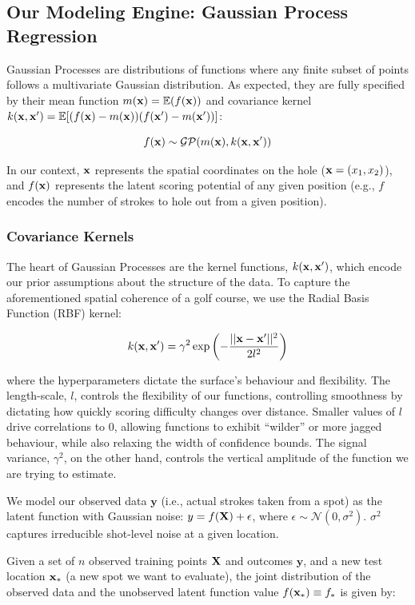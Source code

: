 \documentclass[11pt, letterpaper]{article}
\begin{document}
\subsection{Our Modeling Engine: Gaussian Process Regression}

Gaussian Processes are distributions of functions where any finite subset of points follows a multivariate Gaussian distribution. As expected, they are fully specified by their mean function $m(\mathbf{x}) = \mathbb{E}(f(\mathbf{x}))$  and covariance kernel $k(\mathbf{x},\mathbf{x}') = \mathbb{E}[(f(\mathbf{x})-m(\mathbf{x}))(f(\mathbf{x}')-m(\mathbf{x}'))]$:

\begin{equation}
    f(\mathbf{x}) \sim \mathcal{GP}(m(\mathbf{x}), k(\mathbf{x},\mathbf{x}'))
\end{equation}

In our context, $\mathbf{x}$ represents the spatial coordinates on the hole ($\mathbf{x} = (x_1, x_2)$), and $f(\mathbf{x})$ represents the latent scoring potential of any given position (e.g., $f$ encodes the number of strokes to hole out from a given position).

\subsubsection{Covariance Kernels}
The heart of Gaussian Processes are the kernel functions, $k(\mathbf{x},\mathbf{x}')$, which encode our prior assumptions about the structure of the data. To capture the aforementioned spatial coherence of a golf course, we use the Radial Basis Function (RBF) kernel:

$$k(\mathbf{x},\mathbf{x}') = \gamma^2\exp\left(-\frac{||\mathbf{x}-\mathbf{x}'||^2}{2l^2}\right)$$

where the hyperparameters dictate the surface's behaviour and flexibility. The length-scale, $l$, controls the flexibility of our functions, controlling smoothness by dictating how quickly scoring difficulty changes over distance. Smaller values of $l$ drive correlations to $0$, allowing functions to exhibit ``wilder'' or more jagged behaviour, while also relaxing the width of confidence bounds. The signal variance, $\gamma^2$, on the other hand, controls the vertical amplitude of the function we are trying to estimate.

We model our observed data $\mathbf{y}$ (i.e., actual strokes taken from a spot) as the latent function with Gaussian noise: $y = f(\mathbf{X}) + \epsilon$, where $\epsilon \sim \mathcal{N}(0, \sigma^2)$. $\sigma^2$ captures irreducible shot-level noise at a given location.

Given a set of $n$ observed training points $\mathbf{X}$ and outcomes $\mathbf{y}$, and a new test location $\mathbf{x}_*$ (a new spot we want to evaluate), the joint distribution of the observed data and the unobserved latent function value $f(\mathbf{x}_*)  \equiv f_*$ is given by:
\end{document}
